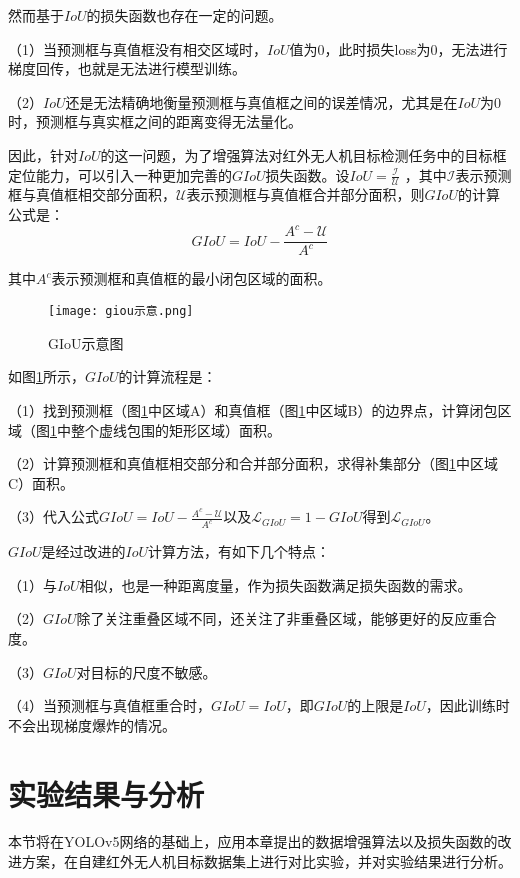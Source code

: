然而基于$IoU$的损失函数也存在一定的问题。

（1）当预测框与真值框没有相交区域时，$IoU$值为0，此时损失loss为0，无法进行梯度回传，也就是无法进行模型训练。

（2）$IoU$还是无法精确地衡量预测框与真值框之间的误差情况，尤其是在$IoU$为0时，预测框与真实框之间的距离变得无法量化。

因此，针对$IoU$的这一问题，为了增强算法对红外无人机目标检测任务中的目标框定位能力，可以引入一种更加完善的$GIoU$损失函数。设$I o U=\frac{\mathcal{I}}{\mathcal{U}}$
，其中$\mathcal{I}$表示预测框与真值框相交部分面积，$\mathcal{U}$表示预测框与真值框合并部分面积，则$GIoU$的计算公式是：
\begin{equation}
  G I o U=I o U-\frac{A^{c}-\mathcal{U}}{A^{c}}
\end{equation}

其中$A^{c}$表示预测框和真值框的最小闭包区域的面积。

\begin{figure}[htbp]
  \centering
  \texttt{[image: giou示意.png]}
  \caption{GIoU示意图}
  \label{gi}
\end{figure}

如图\ref{gi}所示，$GIoU$的计算流程是：

（1）找到预测框（图\ref{gi}中区域A）和真值框（图\ref{gi}中区域B）的边界点，计算闭包区域（图\ref{gi}中整个虚线包围的矩形区域）面积。

（2）计算预测框和真值框相交部分和合并部分面积，求得补集部分（图\ref{gi}中区域C）面积。

（3）代入公式$G I o U=I o U-\frac{A^{c}-\mathcal{U}}{A^{c}}$以及$\mathcal{L}_{G I o U}=1-G I o U$得到$\mathcal{L}_{G I o U}$。

$GIoU$是经过改进的$IoU$计算方法，有如下几个特点：

（1）与$IoU$相似，也是一种距离度量，作为损失函数满足损失函数的需求。

（2）$GIoU$除了关注重叠区域不同，还关注了非重叠区域，能够更好的反应重合度。

（3）$GIoU$对目标的尺度不敏感。

（4）当预测框与真值框重合时，$GIoU=IoU$，即$GIoU$的上限是$IoU$，因此训练时不会出现梯度爆炸的情况。

\section{实验结果与分析}
本节将在YOLOv5网络的基础上，应用本章提出的数据增强算法以及损失函数的改进方案，在自建红外无人机目标数据集上进行对比实验，并对实验结果进行分析。


